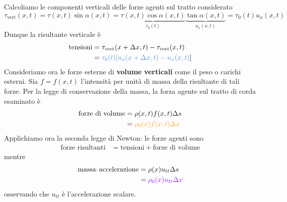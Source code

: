 \documentclass[10pt,a4paper,twoside,openright]{book}
\begin{document}
Calcoliamo le componenti verticali delle forze agenti sul tratto considerato
\begin{equation*}
    \tau _{\text{vert}}(x,t) =\tau (x,t)\sin \alpha (x,t) =\underbrace{\tau (x,t)\cos \alpha (x,t)}_{\tau _{0}(t)}\underbrace{\tan \alpha (x,t)}_{u_{x}(x,t)} =\tau _{0}(t) u_{x}(x,t)
\end{equation*}
Dunque la risultante verticale è
\begin{align*}
    \text{tensioni} & =\tau _{\text{vert}}(x+\Delta x,t) -\tau _{\text{vert}}(x,t)                     \\
                    & =\textcolor[rgb]{0.29,0.56,0.89}{\tau _{0}(t)[ u_{x}(x+\Delta x,t) -u_{x}(x,t)}]
\end{align*}
Consideriamo ora le forze esterne di \textbf{volume} \textbf{verticali} come il peso o carichi esterni. Sia $\displaystyle f=f(x,t)$ l'intensità per unità di massa della risultante di tali forze. Per la legge di conservazione della massa, la forza agente sul tratto di corda esaminato è
\begin{align*}
    \text{forze di volume} & =\rho (x,t) f(x,t) \Delta s                                    \\
                           & =\textcolor[rgb]{0.96,0.65,0.14}{\rho _{0}(x) f(x,t) \Delta x}
\end{align*}
Applichiamo ora la seconda legge di Newton: le forze agenti sono
\begin{align*}
    \text{forze risultanti} & =\text{tensioni} +\text{forze di volume}
\end{align*}
mentre
\begin{align*}
    \text{massa} \cdotp \text{accelerazione} & =\rho (x) u_{tt} \Delta s                                   \\
                                             & =\textcolor[rgb]{0.56,0.07,1}{\rho _{0}(x) u_{tt} \Delta x}
\end{align*}
osservando che $\displaystyle u_{tt}$ è l'accelerazione scalare.
\end{document}
